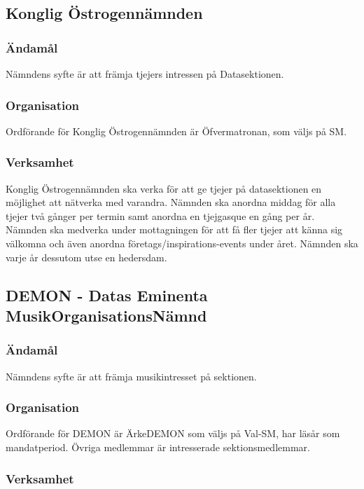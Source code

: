 \documentclass{dgovdoc}
\begin{document}
\subsection{Konglig Östrogennämnden}

\subsubsection{Ändamål}

Nämndens syfte är att främja tjejers intressen på Datasektionen.

\subsubsection{Organisation}

Ordförande för Konglig Östrogennämnden är Öfvermatronan, som väljs på SM.

\subsubsection{Verksamhet}

Konglig Östrogennämnden ska verka för att ge tjejer på datasektionen en
möjlighet att nätverka med varandra. Nämnden ska anordna middag för alla tjejer
två gånger per termin samt anordna en tjejgasque en gång per år. Nämnden ska
medverka under mottagningen för att få fler tjejer att känna sig välkomna och
även anordna företags/inspirations-events under året. Nämnden ska varje år
dessutom utse en hedersdam.

\subsection{DEMON - Datas Eminenta MusikOrganisationsNämnd}

\subsubsection{Ändamål}

Nämndens syfte är att främja musikintresset på sektionen.

\subsubsection{Organisation}

Ordförande för DEMON är ÄrkeDEMON som väljs på Val-SM, har läsår som
mandatperiod. Övriga medlemmar är intresserade sektionsmedlemmar.

\subsubsection{Verksamhet}
\end{document}
